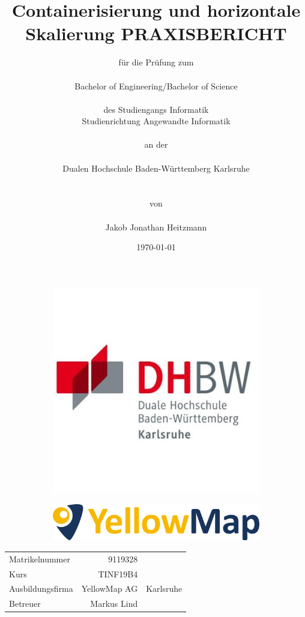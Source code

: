 \documentclass[12pt,a4paper]{article}
\title{\Large{\bfseries Containerisierung und horizontale Skalierung}\vspace{1cm}
	\large PRAXISBERICHT\vspace{1cm}}
\author{für die Prüfung zum\\\\
	Bachelor of Engineering/Bachelor of Science\\\\
	des Studiengangs Informatik\\
	Studienrichtung Angewandte Informatik\\\\
	an der\\\\
	Dualen Hochschule Baden-Württemberg Karlsruhe\\\\\\
	von\\\\
	Jakob Jonathan Heitzmann
}
\date{\today}
\begin{document}

\begin{figure}[t!]
	\begin{subfigure}{0.4\linewidth}
		\includegraphics[scale=0.25]{DHBWKarlsruhe.jpg} 
	\end{subfigure}
	\hspace*{\fill}
	\begin{subfigure}{0.4\linewidth}
    	\includegraphics[scale=0.25]{YellowMap.png}
	\end{subfigure}
\end{figure}

\maketitle
\vspace*{\fill}



\begin{tabular}{p{5cm}rr}
	Matrikelnummer & 9119328\\
	Kurs & TINF19B4\\
	Ausbildungsfirma & YellowMap AG & Karlsruhe\\
	Betreuer & Markus Lind
\end{tabular}
\end{document}
